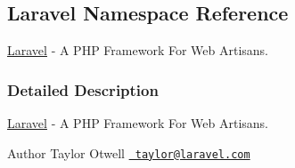 \hypertarget{a00008}{}\subsection{Laravel Namespace Reference}
\label{a00008}


\mbox{\hyperlink{a00008}{Laravel}} -\/ A P\+HP Framework For Web Artisans.  




\subsubsection{Detailed Description}
\mbox{\hyperlink{a00008}{Laravel}} -\/ A P\+HP Framework For Web Artisans. 

\begin{DoxyAuthor}{Author}
Taylor Otwell \href{mailto:taylor@laravel.com}{\texttt{ taylor@laravel.\+com}} 
\end{DoxyAuthor}

